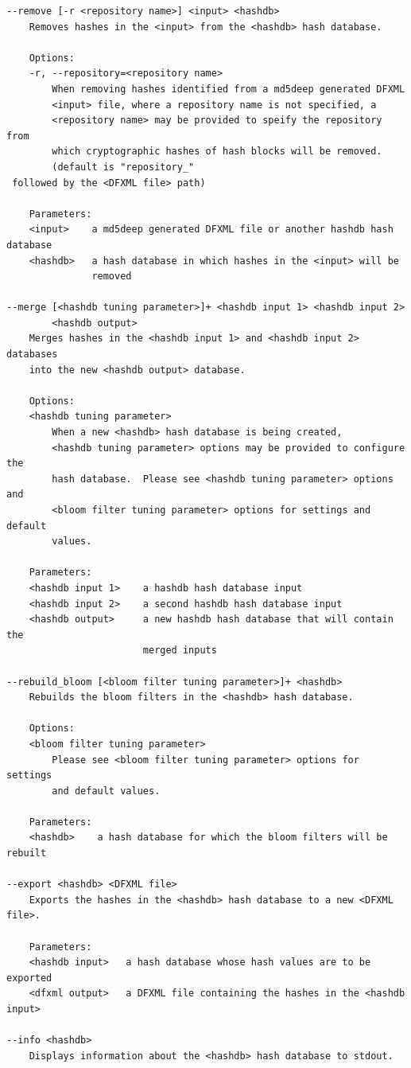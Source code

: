 \documentclass[11pt,twoside]{article}
\begin{document}
\begin{small}
\begin{verbatim}
--remove [-r <repository name>] <input> <hashdb>
    Removes hashes in the <input> from the <hashdb> hash database.

    Options:
    -r, --repository=<repository name>
        When removing hashes identified from a md5deep generated DFXML
        <input> file, where a repository name is not specified, a
        <repository name> may be provided to speify the repository from
        which cryptographic hashes of hash blocks will be removed.
        (default is "repository_"
 followed by the <DFXML file> path)

    Parameters:
    <input>    a md5deep generated DFXML file or another hashdb hash database
    <hashdb>   a hash database in which hashes in the <input> will be
               removed

--merge [<hashdb tuning parameter>]+ <hashdb input 1> <hashdb input 2>
        <hashdb output>
    Merges hashes in the <hashdb input 1> and <hashdb input 2> databases
    into the new <hashdb output> database.

    Options:
    <hashdb tuning parameter>
        When a new <hashdb> hash database is being created,
        <hashdb tuning parameter> options may be provided to configure the
        hash database.  Please see <hashdb tuning parameter> options and
        <bloom filter tuning parameter> options for settings and default
        values.

    Parameters:
    <hashdb input 1>    a hashdb hash database input
    <hashdb input 2>    a second hashdb hash database input
    <hashdb output>     a new hashdb hash database that will contain the
                        merged inputs

--rebuild_bloom [<bloom filter tuning parameter>]+ <hashdb>
    Rebuilds the bloom filters in the <hashdb> hash database.

    Options:
    <bloom filter tuning parameter>
        Please see <bloom filter tuning parameter> options for settings
        and default values.

    Parameters:
    <hashdb>    a hash database for which the bloom filters will be rebuilt

--export <hashdb> <DFXML file>
    Exports the hashes in the <hashdb> hash database to a new <DFXML file>.

    Parameters:
    <hashdb input>   a hash database whose hash values are to be exported
    <dfxml output>   a DFXML file containing the hashes in the <hashdb input>

--info <hashdb>
    Displays information about the <hashdb> hash database to stdout.


\end{verbatim}
\end{small}
\end{document}
